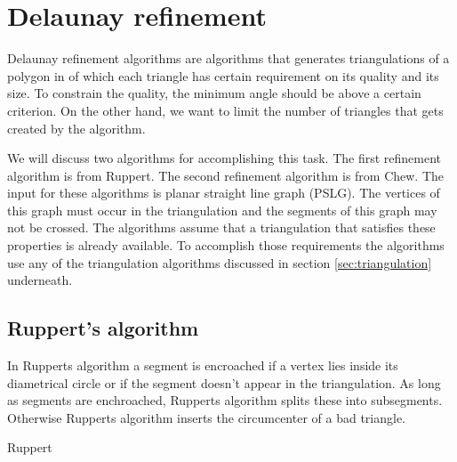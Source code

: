 \section{Delaunay refinement}
\label{sec:refinement}

Delaunay refinement algorithms are algorithms that generates triangulations of a polygon in of which each triangle has certain requirement on its quality and its size.
To constrain the quality, the minimum angle should be above a certain criterion.
On the other hand, we want to limit the number of triangles that gets created by the algorithm.

We will discuss two algorithms for accomplishing this task.
The first refinement algorithm is from Ruppert.
The second refinement algorithm is from Chew.
The input for these algorithms is planar straight line graph (PSLG). 
The vertices of this graph must occur in the triangulation and the segments of this graph may not be crossed.
The algorithms assume that a triangulation that satisfies these properties is already available.
To accomplish those requirements the algorithms use any of the triangulation algorithms discussed in section \ref{sec:triangulation} underneath.
\cite{shewchuk}

\subsection{Ruppert's algorithm}
\label{sub:ruppert}

In Rupperts algorithm a segment is encroached if a vertex lies inside its diametrical circle or if the segment doesn't appear in the triangulation.
As long as segments are enchroached, Rupperts algorithm splits these into subsegments.
Otherwise Rupperts algorithm inserts the circumcenter of a bad triangle.
\cite{shewchuk}

\begin{algorithm}
    \caption{Ruppert}
    \begin{algorithmic}
                \Else
                \EndIf
            \EndWhile
        \EndFunction
    \end{algorithmic}
\end{algorithm}

